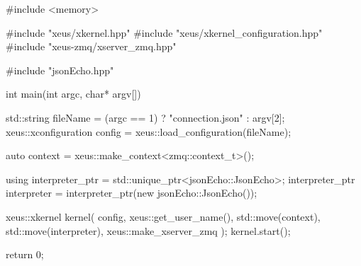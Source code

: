 
\begintext

\startCCode
#include <memory>

#include "xeus/xkernel.hpp"
#include "xeus/xkernel_configuration.hpp"
#include "xeus-zmq/xserver_zmq.hpp"

#include "jsonEcho.hpp"

int main(int argc, char* argv[]) {
  std::string fileName = (argc == 1) ? "connection.json" : argv[2];
  xeus::xconfiguration config = xeus::load_configuration(fileName);

  auto context = xeus::make_context<zmq::context_t>();

  using interpreter_ptr = std::unique_ptr<jsonEcho::JsonEcho>;
  interpreter_ptr interpreter = interpreter_ptr(new jsonEcho::JsonEcho());

  xeus::xkernel kernel(
    config, xeus::get_user_name(), 
    std::move(context), std::move(interpreter),
    xeus::make_xserver_zmq
  );
  kernel.start();

  return 0;
}
\stopCCode

\endtext